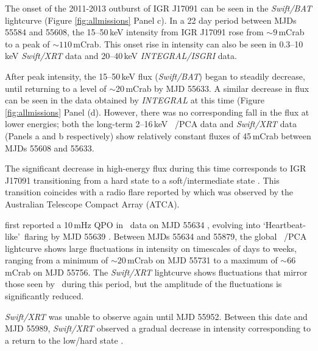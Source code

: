 \par The onset of the 2011-2013 outburst of IGR J17091 can be seen in the \indexbat\textit{Swift/BAT} lightcurve (Figure \ref{fig:allmissions} Panel c).  In a 22 day period between MJDs 55584 and 55608, the 15--50\,keV intensity from IGR J17091 rose from $\sim9$\,mCrab to a peak of $\sim110$\,mCrab.  This onset rise in intensity can also be seen in 0.3--10\,keV \indexxrt\textit{Swift/XRT} data and 20--40\,keV \indexibis\textit{INTEGRAL/ISGRI} data.
\par After peak intensity, the 15--50\,keV flux (\textit{Swift/BAT}) began to steadily decrease, until returning to a level of $\sim$20\,mCrab by MJD 55633.  A similar decrease in flux can be seen in the data obtained by \textit{INTEGRAL} at this time (Figure \ref{fig:allmissions} Panel (d).  However, there was no corresponding fall in the flux at lower energies; both the long-term 2--16\,keV \indexpca\rxte\ /PCA data and \textit{Swift/XRT} data (Panels a and b respectively) show relatively constant fluxes of 45\,mCrab between MJDs 55608 and 55633.
\par The significant decrease in high-energy flux during this time corresponds to IGR J17091 transitioning from a hard state to a soft/intermediate state \citep{Pahari_RhoDiff}.  This transition coincides with a radio flare reported by \citet{Rodriguez_D} which was observed by the Australian Telescope Compact Array (ATCA).
\par \citealp{Altamirano_10Hz} first reported a 10\,mHz QPO in \rxte\ data on MJD 55634 , evolving into `Heartbeat-like'\indexrho\ flaring by MJD 55639 \citep{Altamirano_Discovery}.  Between MJDs 55634 and 55879, the global \indexpca\rxte\ /PCA lightcurve shows large fluctuations in intensity on timescales of days to weeks, ranging from a minimum of $\sim20$\,mCrab on MJD 55731 to a maximum of $\sim66$\,mCrab on MJD 55756.  The \indexxrt\textit{Swift/XRT} lightcurve shows fluctuations that mirror those seen by \rxte\ during this period, but the amplitude of the fluctuations is significantly reduced.
\par \indexxrt\textit{Swift/XRT} was unable to observe again until MJD 55952.  Between this date and MJD 55989, \textit{Swift/XRT} observed a gradual decrease in intensity corresponding to a return to the low/hard state \citep{Drave_Return}.
